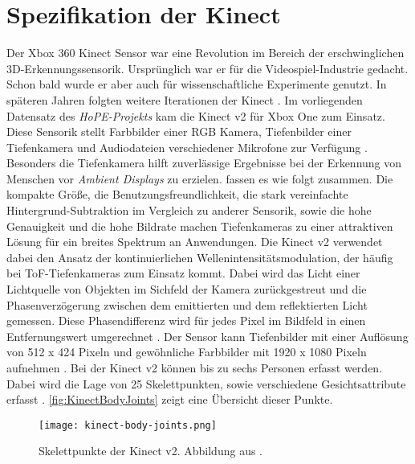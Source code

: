 \section{Spezifikation der Kinect}
\label{chapter1-SpezifikationKinect}
Der Xbox 360 Kinect Sensor war eine Revolution im Bereich der erschwinglichen 3D-Erkennungssensorik.
Ursprünglich war er für die Videospiel-Industrie gedacht.
Schon bald wurde er aber auch für wissenschaftliche Experimente genutzt.
In späteren Jahren folgten weitere Iterationen der Kinect \citep{tolgyessy_evaluation_2021}.
Im vorliegenden Datensatz des \emph{HoPE-Projekts} kam die Kinect v2 für Xbox One zum Einsatz.
Diese Sensorik stellt Farbbilder einer \ac{RGB} Kamera, Tiefenbilder einer Tiefenkamera
und Audiodateien verschiedener Mikrofone zur Verfügung \citep{windows-developer-center_microsoft_corporation_human_2014}.
Besonders die Tiefenkamera hilft zuverlässige Ergebnisse bei der Erkennung von Menschen vor \emph{Ambient Displays} zu erzielen.
\citet{li_time-flight_2014} fassen es wie folgt zusammen.
Die kompakte Größe, die Benutzungsfreundlichkeit,
die stark vereinfachte Hintergrund-Subtraktion im Vergleich zu anderer Sensorik, sowie die hohe Genauigkeit
und die hohe Bildrate machen Tiefenkameras zu einer attraktiven Lösung für ein breites Spektrum an Anwendungen.
Die Kinect v2 verwendet dabei den Ansatz der kontinuierlichen Wellenintensitätsmodulation,
der häufig bei \ac{ToF}-Tiefenkameras zum Einsatz kommt.
Dabei wird das Licht einer Lichtquelle von Objekten im Sichfeld der Kamera zurückgestreut
und die Phasenverzögerung zwischen dem emittierten und dem reflektierten Licht gemessen.
Diese Phasendifferenz wird für jedes Pixel im Bildfeld in einen Entfernungswert umgerechnet \citep{tolgyessy_evaluation_2021}.
Der Sensor kann Tiefenbilder mit einer Auflösung von 512 x 424 Pixeln
und gewöhnliche Farbbilder mit 1920 x 1080 Pixeln aufnehmen \citep{marin_multi-camera_2019}.
Bei der Kinect v2 können bis zu sechs Personen erfasst werden.
Dabei wird die Lage von 25 Skelettpunkten, sowie verschiedene Gesichtsattribute erfasst \citep{windows-developer-center_microsoft_corporation_human_2014}.
\autoref{fig:KinectBodyJoints} zeigt eine Übersicht dieser Punkte. 

\begin{figure}[ht]
  \begin{center}
  \texttt{[image: kinect-body-joints.png]}
  \end{center}
  \caption{Skelettpunkte der Kinect v2. Abbildung aus \citet{windows-developer-center_microsoft_corporation_human_2014}.}
  \label{fig:KinectBodyJoints}
\end{figure}


